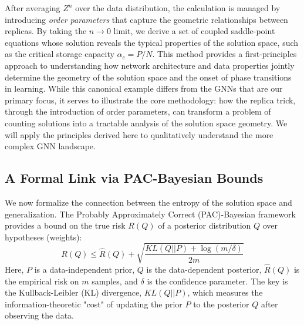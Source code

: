 \documentclass[10pt,oneside,oldfontcommands,dvipsnames,article]{memoir}
\begin{document}
After averaging $Z^n$ over the data distribution, the calculation is managed by introducing \textit{order parameters} that capture the geometric relationships between replicas. By taking the $n \to 0$ limit, we derive a set of coupled saddle-point equations whose solution reveals the typical properties of the solution space, such as the critical storage capacity $\alpha_c = P/N$. This method provides a first-principles approach to understanding how network architecture and data properties jointly determine the geometry of the solution space and the onset of phase transitions in learning. While this canonical example differs from the GNNs that are our primary focus, it serves to illustrate the core methodology: how the replica trick, through the introduction of order parameters, can transform a problem of counting solutions into a tractable analysis of the solution space geometry. We will apply the principles derived here to qualitatively understand the more complex GNN landscape.

\subsection{A Formal Link via PAC-Bayesian Bounds}
We now formalize the connection between the entropy of the solution space and generalization. The Probably Approximately Correct (PAC)-Bayesian framework provides a bound on the true risk $R(Q)$ of a posterior distribution $Q$ over hypotheses (weights):
\begin{equation}
    R(Q) \le \hat{R}(Q) + \sqrt{\frac{KL(Q || P) + \log(m/\delta)}{2m}}
\end{equation}
Here, $P$ is a data-independent prior, $Q$ is the data-dependent posterior, $\hat{R}(Q)$ is the empirical risk on $m$ samples, and $\delta$ is the confidence parameter. The key is the Kullback-Leibler (KL) divergence, $KL(Q || P)$, which measures the information-theoretic "cost" of updating the prior $P$ to the posterior $Q$ after observing the data.
\end{document}
